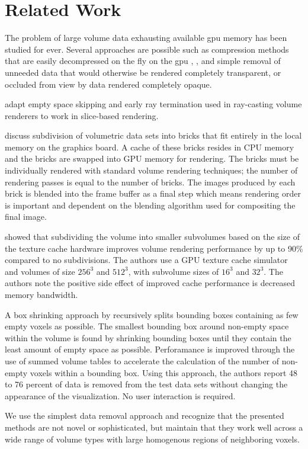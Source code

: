 \documentclass[journal]{vgtc}                %
\begin{document}
\section{Related Work}
The problem of large volume data exhausting available gpu memory has been studied
for ever. Several approaches are possible such as compression methods that are easily
decompressed on the fly on the gpu \cite{Muraki1993}, \cite{Ihm1999}, and 
simple removal of unneeded data that would otherwise be rendered completely transparent, 
or occluded from view by data rendered completely opaque.

\cite{Li2003} adapt empty space skipping and early ray termination used in
ray-casting volume renderers to work in slice-based rendering. 

\cite{Engel2004} discuss subdivision of volumetric data sets into bricks that
fit entirely in the local memory on the graphics board.  A cache of these
bricks resides in CPU memory and the bricks are swapped into GPU memory for
rendering. The bricks must be individually rendered with standard volume
rendering techniques; the number of rendering passes is equal to the number of
bricks.  The images produced by each brick is blended into the frame buffer as
a final step which means rendering order is important and dependent on 
the blending algorithm used for compositing the final image.  

\cite{Lee2004} showed that subdividing the volume into smaller subvolumes based
on the size of the texture cache hardware improves volume rendering performance
by up to 90\% compared to no subdivisions. The authors use a GPU texture cache
simulator and volumes of size $256^3$ and $512^3$, with subvolume sizes
of $16^3$ and $32^3$. The authors note the positive side effect of improved 
cache performance is decreased memory bandwidth. 

A box shrinking approach by \cite{Vidal2008} recursively splits bounding
boxes containing as few empty voxels as possible. The smallest bounding box
around non-empty space within the volume is found by shrinking bounding
boxes until they contain the least amount of empty space as possible. 
Perforamance is improved through the use of summed volume tables to accelerate 
the calculation of the number of 
non-empty voxels within a bounding box. Using this approach, the authors
report 48 to 76 percent of data is removed from the test data sets without
changing the appearance of the visualization. No user interaction is required.

We use the simplest data removal approach and recognize that the presented
methods are not novel or sophisticated, but maintain that they work well
across a wide range of volume types with large homogenous regions of neighboring
voxels.
\end{document}
